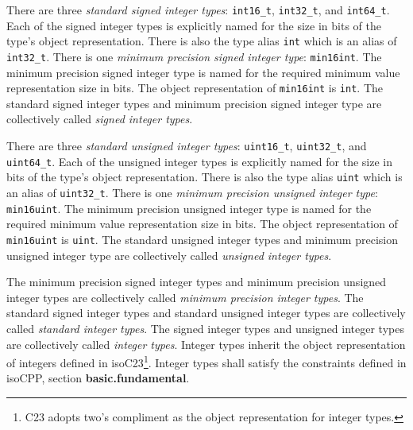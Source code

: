 
\p There are three \textit{standard signed integer types}: \texttt{int16\_t},
\texttt{int32\_t}, and \texttt{int64\_t}. Each of the signed integer types is
explicitly named for the size in bits of the type's object representation. There
is also the type alias \texttt{int} which is an alias of \texttt{int32\_t}.
There is one \textit{minimum precision signed integer type}: \texttt{min16int}.
The minimum precision signed integer type is named for the required minimum
value representation size in bits. The object representation of
\texttt{min16int} is \texttt{int}. The standard signed integer types and minimum
precision signed integer type are collectively called \textit{signed integer
types}.

\p There are three \textit{standard unsigned integer types}: \texttt{uint16\_t},
\texttt{uint32\_t}, and \texttt{uint64\_t}. Each of the unsigned integer types
is explicitly named for the size in bits of the type's object representation.
There is also the type alias \texttt{uint} which is an alias of
\texttt{uint32\_t}. There is one \textit{minimum precision unsigned integer
type}: \texttt{min16uint}. The minimum precision unsigned integer type is named
for the required minimum value representation size in bits. The object
representation of \texttt{min16uint} is \texttt{uint}. The standard unsigned
integer types and minimum precision unsigned integer type are collectively
called \textit{unsigned integer types}.

\p The minimum precision signed integer types and minimum precision unsigned
integer types are collectively called \textit{minimum precision integer types}.
The standard signed integer types and standard unsigned integer types are
collectively called \textit{standard integer types}. The signed integer types
and unsigned integer types are collectively called \textit{integer types}.
Integer types inherit the object representation of integers defined in
\glsdesc{isoC23}\footnote{C23 adopts two's compliment as the object
representation for integer types.}. Integer types shall satisfy the constraints
defined in \glsdesc{isoCPP}, section \textbf{basic.fundamental}.

